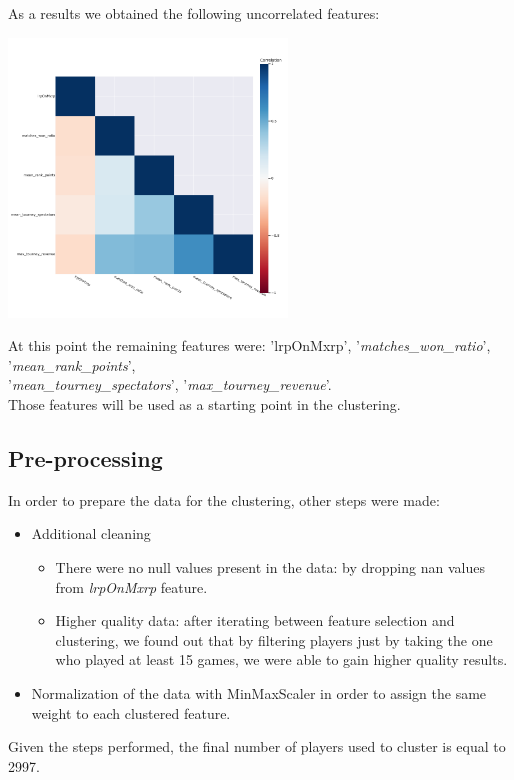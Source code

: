 As a results we obtained the following uncorrelated features:
\begin{center}
	\includegraphics[width=280px]{plots/correlation_plot}
	\label{fig:correlation_plot}
	\label{fig1}
\end{center}
At this point the remaining features were: 'lrpOnMxrp', '\textit{matches\_won\_ratio}', '\textit{mean\_rank\_points}',\\ '\textit{mean\_tourney\_spectators}', '\textit{max\_tourney\_revenue}'.\\
Those features will be used as a starting point in the clustering.

\subsection{Pre-processing}
In order to prepare the data for the clustering, other steps were made:
\begin{itemize}
	\item Additional cleaning
	      \begin{itemize}
	      	\item There were no null values present in the data: by dropping nan values from \textit{lrpOnMxrp} feature.
	      	\item Higher quality data: after iterating between feature selection and clustering, we found out that by filtering players just by taking the one who played at least 15 games, we were able to gain higher quality results.
	      \end{itemize}
	\item Normalization of the data with MinMaxScaler in order to assign the same weight to each clustered feature.
\end{itemize}
Given the steps performed, the final number of players used to cluster is equal to 2997.

